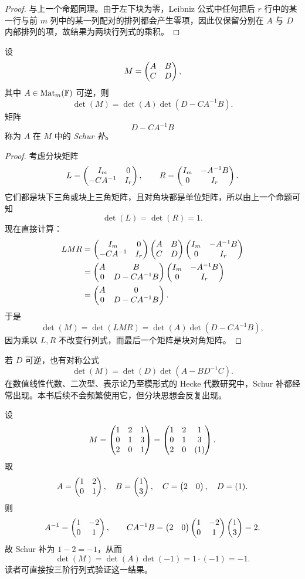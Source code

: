 \begin{proof}
与上一个命题同理。由于左下块为零，Leibniz 公式中任何把后 $r$ 行中的某一行与前 $m$ 列中的某一列配对的排列都会产生零项，因此仅保留分别在 $A$ 与 $D$ 内部排列的项，故结果为两块行列式的乘积。
\end{proof}

\begin{theorem}
设
\[
M=\begin{pmatrix} A&B\\C&D \end{pmatrix},
\]
其中 $A\in\mathrm{Mat}_m(\mathbb{F})$ 可逆，则
\[
\det(M)=\det(A)\det(D-CA^{-1}B).
\]
矩阵
\[
D-CA^{-1}B
\]
称为 $A$ 在 $M$ 中的 \emph{Schur 补}。
\end{theorem}

\begin{proof}
考虑分块矩阵
\[
L=\begin{pmatrix} I_m&0\\-CA^{-1}&I_r \end{pmatrix},
\qquad
R=\begin{pmatrix} I_m&-A^{-1}B\\0&I_r \end{pmatrix}.
\]
它们都是块下三角或块上三角矩阵，且对角块都是单位矩阵，所以由上一个命题可知
\[
\det(L)=\det(R)=1.
\]
现在直接计算：
\begin{align*}
LMR
&=
\begin{pmatrix} I_m&0\\-CA^{-1}&I_r \end{pmatrix}
\begin{pmatrix} A&B\\C&D \end{pmatrix}
\begin{pmatrix} I_m&-A^{-1}B\\0&I_r \end{pmatrix}\\
&=
\begin{pmatrix} A&B\\0&D-CA^{-1}B \end{pmatrix}
\begin{pmatrix} I_m&-A^{-1}B\\0&I_r \end{pmatrix}\\
&=
\begin{pmatrix} A&0\\0&D-CA^{-1}B \end{pmatrix}.
\end{align*}
于是
\[
\det(M)=\det(LMR)=\det(A)\det(D-CA^{-1}B),
\]
因为乘以 $L,R$ 不改变行列式，而最后一个矩阵是块对角矩阵。
\end{proof}

\begin{remark}
若 $D$ 可逆，也有对称公式
\[
\det(M)=\det(D)\det(A-BD^{-1}C).
\]
在数值线性代数、二次型、表示论乃至模形式的 Hecke 代数研究中，Schur 补都经常出现。本书后续不会频繁使用它，但分块思想会反复出现。
\end{remark}

\begin{example}
设
\[
M=\begin{pmatrix} 1&2&1\\0&1&3\\2&0&1 \end{pmatrix}
=
\begin{pmatrix} \begin{matrix}1&2\\0&1\end{matrix}&\begin{matrix}1\\3\end{matrix}\\
\begin{matrix}2&0\end{matrix}&(1) \end{pmatrix}.
\]
取
\[
A=\begin{pmatrix} 1&2\\0&1 \end{pmatrix},\quad B=\begin{pmatrix} 1\\3 \end{pmatrix},\quad C=\begin{pmatrix} 2&0 \end{pmatrix},\quad D=(1).
\]
则
\[
A^{-1}=\begin{pmatrix} 1&-2\\0&1 \end{pmatrix},
\qquad
CA^{-1}B=\begin{pmatrix} 2&0 \end{pmatrix}\begin{pmatrix} 1&-2\\0&1 \end{pmatrix}\begin{pmatrix} 1\\3 \end{pmatrix}=2.
\]
故 Schur 补为 $1-2=-1$，从而
\[
\det(M)=\det(A)\det(-1)=1\cdot(-1)=-1.
\]
读者可直接按三阶行列式验证这一结果。
\end{example}

